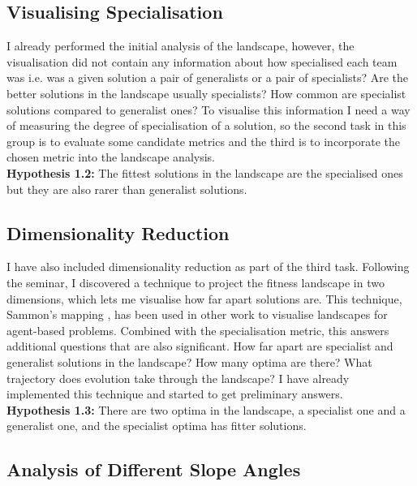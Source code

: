 \documentclass[12pt]{article}
\begin{document}
\subsection{Visualising Specialisation}\label{visualising_specialisation}

I already performed the initial analysis of the landscape, however, the visualisation did not contain any information about how specialised each team was i.e. was a given solution a pair of generalists or a pair of specialists? 
Are the better solutions in the landscape usually specialists? 
How common are specialist solutions compared to generalist ones? 
To visualise this information I need a way of measuring the degree of specialisation of a solution, so the second task in this group is to evaluate some candidate metrics and the third is to incorporate the chosen metric into the landscape analysis.\\

\textbf{Hypothesis 1.2:} The fittest solutions in the landscape are the specialised ones but they are also rarer than generalist solutions.\\

\subsection{Dimensionality Reduction}

I have also included dimensionality reduction as part of the third task.
Following the seminar, I discovered a technique to project the fitness landscape in two dimensions, which lets me visualise how far apart solutions are.
This technique, Sammon's mapping \cite{sammon:IEEETR:1969}, has been used in other work \cite{kim:GECCO:2003, risi:AB:2010} to visualise landscapes for agent-based problems.
Combined with the specialisation metric, this answers additional questions that are also significant.
How far apart are specialist and generalist solutions in the landscape?
How many optima are there?
What trajectory does evolution take through the landscape?
I have already implemented this technique and started to get preliminary answers.\\

\textbf{Hypothesis 1.3:} There are two optima in the landscape, a specialist one and a generalist one, and the specialist optima has fitter solutions. \\

\subsection{Analysis of Different Slope Angles}
\end{document}
